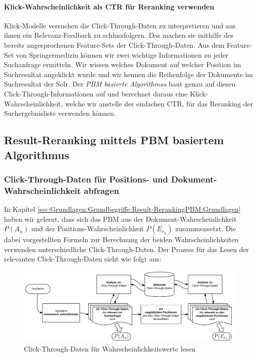 \paragraph{Klick-Wahrscheinlichkeit als CTR für Reranking verwenden} 
Klick-Modelle versuchen die Click-Through-Daten zu interpretieren und aus ihnen ein Relevanz-Feedback zu schlussfolgern. Das machen sie mithilfe des bereits angesprochenen Feature-Sets der Click-Through-Daten. Aus dem Feature-Set von Springermedizin können wir zwei wichtige Informationen zu jeder Suchanfrage ermitteln. Wir wissen welches Dokument auf welcher Position im Suchresultat angeklickt wurde und wir kennen die Reihenfolge der Dokumente im Suchresultat der Solr. Der \textit{PBM basierte Algorithmus} baut genau auf diesen Click-Through-Informationen auf und berechnet daraus eine Klick-Wahrscheinlichkeit, welche wir anstelle der einfachen CTR, für das Reranking der Suchergebnisliste verwenden können. 

\pagebreak

\subsection{Result-Reranking mittels PBM basiertem Algorithmus}
\label{sec:Reranking:Methodik:Result-RerankingPBM}

\subsubsection{Click-Through-Daten für Positions- und Dokument-Wahrscheinlichkeit abfragen}
\label{sec:Reranking:Methodik:Result-RerankingPBM:PositionDokumentWahrscheinlichkeiten}

In Kapitel \ref{sec:Grundlagen:Grundbegriffe:Result-RerankingPBM:Grundlagen} haben wir gelernt, dass sich das PBM aus der Dokument-Wahrscheinlichkeit $P(A_{u})$ und der Positions-Wahrscheinlichkeit $P(E_{r_{u}})$ zusammensetzt. Die dabei vorgestellten Formeln zur Berechnung der beiden Wahrscheinlichkeiten verwenden unterschiedliche Click-Through-Daten. Der Prozess für das Lesen der relevanten Click-Through-Daten sieht wie folgt aus:

\begin{figure}[H]
\centering
\vspace{-1em}
\caption[Click-Through-Daten für Wahrscheinlichkeitswerte lesen]{Click-Through-Daten für Wahrscheinlichkeitswerte lesen}
\label{fig:WahrscheinlichkeitswerteCTDaten}
\includegraphics[width=\linewidth]{gfx/WahrscheinlichkeitswerteCTDaten}
\vspace{-2.5em}
\end{figure}

